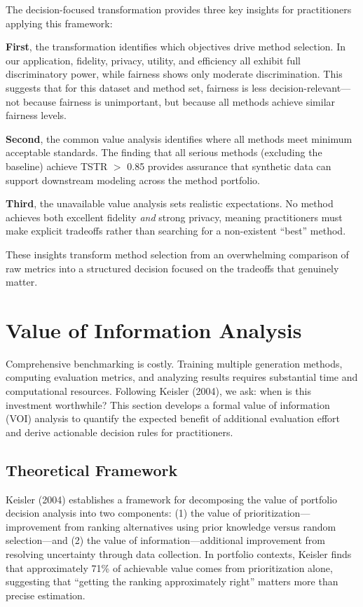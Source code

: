 \documentclass[12pt,a4paper]{article}
\begin{document}
The decision-focused transformation provides three key insights for practitioners applying this framework:

\textbf{First}, the transformation identifies which objectives drive method selection. In our application, fidelity, privacy, utility, and efficiency all exhibit full discriminatory power, while fairness shows only moderate discrimination. This suggests that for this dataset and method set, fairness is less decision-relevant---not because fairness is unimportant, but because all methods achieve similar fairness levels.

\textbf{Second}, the common value analysis identifies where all methods meet minimum acceptable standards. The finding that all serious methods (excluding the baseline) achieve TSTR $>$ 0.85 provides assurance that synthetic data can support downstream modeling across the method portfolio.

\textbf{Third}, the unavailable value analysis sets realistic expectations. No method achieves both excellent fidelity \textit{and} strong privacy, meaning practitioners must make explicit tradeoffs rather than searching for a non-existent ``best'' method.

These insights transform method selection from an overwhelming comparison of raw metrics into a structured decision focused on the tradeoffs that genuinely matter.

\section{Value of Information Analysis}

Comprehensive benchmarking is costly. Training multiple generation methods, computing evaluation metrics, and analyzing results requires substantial time and computational resources. Following Keisler (2004), we ask: when is this investment worthwhile? This section develops a formal value of information (VOI) analysis to quantify the expected benefit of additional evaluation effort and derive actionable decision rules for practitioners.

\subsection{Theoretical Framework}

Keisler (2004) establishes a framework for decomposing the value of portfolio decision analysis into two components: (1) the value of prioritization---improvement from ranking alternatives using prior knowledge versus random selection---and (2) the value of information---additional improvement from resolving uncertainty through data collection. In portfolio contexts, Keisler finds that approximately 71\% of achievable value comes from prioritization alone, suggesting that ``getting the ranking approximately right'' matters more than precise estimation.
\end{document}
